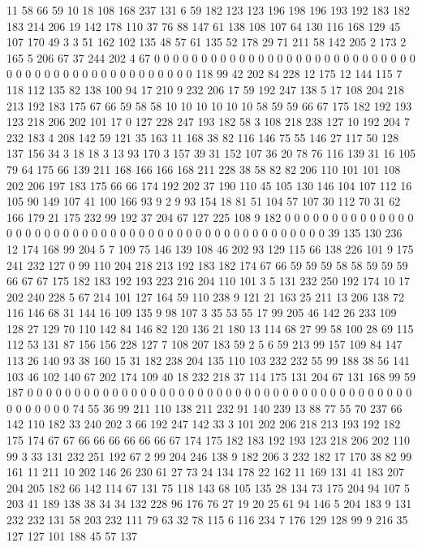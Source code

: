 11 58 66 59 10 18 108 168 237 131 6 59 182 123 123 196 198 196 193 192
183 182 183 214 206 19 142 178 110 37 76 88 147 61 138 108 107 64 130 116
168 129 45 107 170 49 3 3 51 162 102 135 48 57 61 135 52 178 29 71
211 58 142 205 2 173 2 165 5 206 67 37 244 202 4 67 0 0 0 0
0 0 0 0 0 0 0 0 0 0 0 0 0 0 0 0 0 0 0 0
0 0 0 0 0 0 0 0 0 0 0 0 0 0 0 0 0 0 0 0
0 0 0 0 118 99 42 202 84 228 12 175 12 144 115 7 118 112 135 82
138 100 94 17 210 9 232 206 17 59 192 247 138 5 17 108 204 218 213 192
183 175 67 66 59 58 58 10 10 10 10 10 10 58 59 59 66 67 175 182
192 193 123 218 206 202 101 17 0 127 228 247 193 182 58 3 108 218 238 127
10 192 204 7 232 183 4 208 142 59 121 35 163 11 168 38 82 116 146 75
55 146 27 117 50 128 137 156 34 3 18 18 3 13 93 170 3 157 39 31
152 107 36 20 78 76 116 139 31 16 105 79 64 175 66 139 211 168 166 166
168 211 228 38 58 82 82 206 110 101 101 108 202 206 197 183 175 66 66 174
192 202 37 190 110 45 105 130 146 104 107 112 16 105 90 149 107 41 100 166
93 9 2 9 93 154 18 81 51 104 57 107 30 112 70 31 62 166 179 21
175 232 99 192 37 204 67 127 225 108 9 182 0 0 0 0 0 0 0 0
0 0 0 0 0 0 0 0 0 0 0 0 0 0 0 0 0 0 0 0
0 0 0 0 0 0 0 0 0 0 0 0 0 0 0 0 0 0 0 0
39 135 130 236 12 174 168 99 204 5 7 109 75 146 139 108 46 202 93 129
115 66 138 226 101 9 175 241 232 127 0 99 110 204 218 213 192 183 182 174
67 66 59 59 59 58 58 59 59 59 66 67 67 175 182 183 192 193 223 216
204 110 101 3 5 131 232 250 192 174 10 17 202 240 228 5 67 214 101 127
164 59 110 238 9 121 21 163 25 211 13 206 138 72 116 146 68 31 144 16
109 135 9 98 107 3 35 53 55 17 99 205 46 142 26 233 109 128 27 129
70 110 142 84 146 82 120 136 21 180 13 114 68 27 99 58 100 28 69 115
112 53 131 87 156 156 228 127 7 108 207 183 59 2 5 6 59 213 99 157
109 84 147 113 26 140 93 38 160 15 31 182 238 204 135 110 103 232 232 55
99 188 38 56 141 103 46 102 140 67 202 174 109 40 18 232 218 37 114 175
131 204 67 131 168 99 59 187 0 0 0 0 0 0 0 0 0 0 0 0
0 0 0 0 0 0 0 0 0 0 0 0 0 0 0 0 0 0 0 0
0 0 0 0 0 0 0 0 0 0 0 0 0 0 0 0 74 55 36 99
211 110 138 211 232 91 140 239 13 88 77 55 70 237 66 142 110 182 33 240
202 3 66 192 247 142 33 3 101 202 206 218 213 193 192 182 175 174 67 67
66 66 66 66 66 66 67 174 175 182 183 192 193 123 218 206 202 110 99 3
33 131 232 251 192 67 2 99 204 246 138 9 182 206 3 232 182 17 170 38
82 99 161 11 211 10 202 146 26 230 61 27 73 24 134 178 22 162 11 169
131 41 183 207 204 205 182 66 142 114 67 131 75 118 143 68 105 135 28 134
73 175 204 94 107 5 203 41 189 138 38 34 34 132 228 96 176 76 27 19
20 25 61 94 146 5 204 183 9 131 232 232 131 58 203 232 111 79 63 32
78 115 6 116 234 7 176 129 128 99 9 216 35 127 127 101 188 45 57 137
